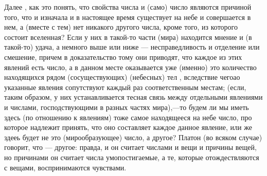 \documentclass{article}
\begin{document}
Далее , как это понять, что свойства числа и (само) число являются причиной того, что и изначала и в настоящее время существует на небе и совершается в нем, а (вместе с тем) нет никакого другого числа, кроме того, из которого состоит вселенная? Если у них в такой-то части (мира) находится мнение и (в такой-то) удача, а немного выше или ниже — несправедливость и отделение или смешение, причем в доказательство тому они приводят, что каждое из этих явлений есть число, а в данном месте оказывается уже (именно) это количество находящихся рядом (сосуществующих) (небесных) тел , вследствие чегоао указанные явления сопутствуют каждый раз соответственным местам; (если, таким образом, у них устанавливается тесная связь между отдельными явлениями и числами, господствующими в разных частях мира),—то будем ли мы иметь здесь (по отношению к явлениям) тоже самое находящееся на небе число, про которое надлежит принять, что оно составляет каждое данное явление, или же здееь будет не это (мирообразующее) число, а другое? Платон (во всяком случае) говорит, что — другое: правда, и он считает числами и вещи и причины вещей, но причинами он считает числа умопостигаемые, а те, которые отождествляются с вещами, воспринимаются чувствами.
\end{document}

